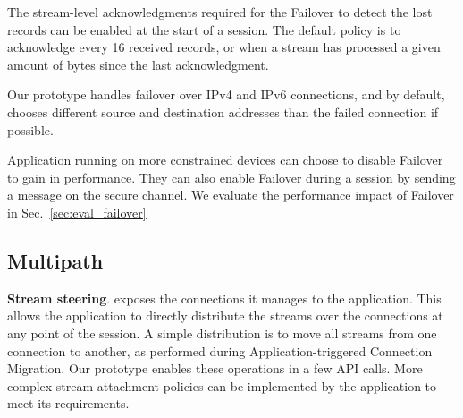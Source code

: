 The stream-level acknowledgments required for the Failover to detect the lost
\tcpls records can be enabled at the start of a \tcpls session. The default
policy is to acknowledge every 16 received records, or when a
stream has processed
a given amount of bytes since the last acknowledgment.

Our prototype handles failover over IPv4 and IPv6 \tcp connections, and by default, chooses different source and destination addresses than the failed \tcp connection if possible.

Application running on more constrained devices can choose to disable Failover
to gain in performance. They can also enable Failover during a \tcpls session
by sending a message on the secure channel. We evaluate the performance impact of Failover in Sec.~\ref{sec:eval_failover}


\subsection{Multipath}
\label{sec:prot-multipath}

\textbf{Stream steering}.
\tcpls exposes the \tcp connections it manages to the application. This allows
the application to directly distribute the \tcpls streams over the \tcp
connections at any point of the \tcpls session. A simple distribution is to
move all \tcpls streams from one connection to another, as performed during
Application-triggered Connection Migration. Our prototype enables these
operations in a few API calls. More complex stream attachment policies can be
implemented by the application to meet its requirements.

